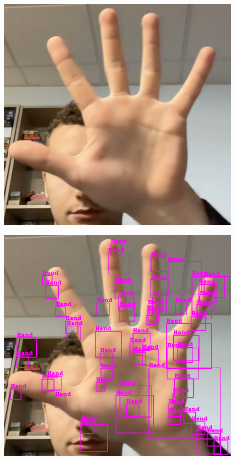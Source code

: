 \documentclass[11pt]{article}
\begin{document}
\begin{minipage}{0.45\textwidth}
    \centering
    \includegraphics[width=0.9\textwidth]{images/cascade2.png}
    \label{fig:res_cascade2}
\end{minipage}
\begin{minipage}{0.45\textwidth}
    \centering
    \includegraphics[width=0.9\textwidth]{images/cascade3.png}
    \label{fig:res_cascade3}
\end{minipage}
\end{document}
